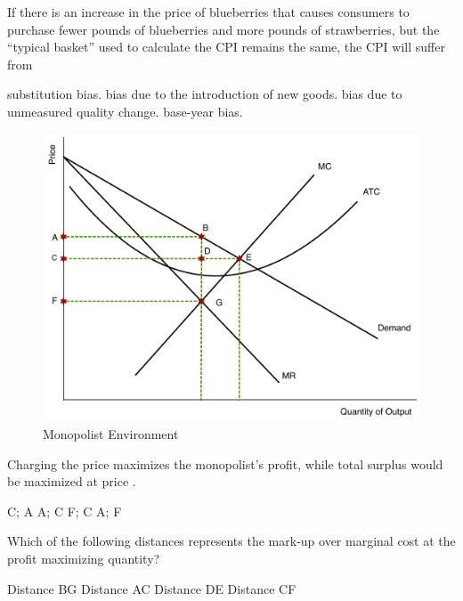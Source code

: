 \documentclass[addpoints,11pt]{exam}
\theoremstyle{definition}
\newcommand{\blank}[0]{\underline{\hspace{3cm}}}
\begin{document}
\begin{questions}
\newpage

	\question If there is an increase in the price of blueberries that causes consumers to purchase fewer pounds of blueberries and more pounds of strawberries, but the ``typical basket'' used to calculate the CPI remains the same, the CPI will suffer from

\begin{choices}
	\CorrectChoice substitution bias.
	\choice bias due to the introduction of new goods.
	\choice bias due to unmeasured quality change.
	\choice base-year bias. 
\end{choices}


\begin{figure}[H]
	\centering
	\includegraphics[scale=.4]{Exam2_MC10.pdf}
	\caption{Monopolist Environment}
	\label{MC10}
\end{figure}

\question \label{q9} Charging the price \blank maximizes the monopolist's profit, while total surplus would be maximized at price \blank.

\begin{choices}
	\choice C; A
	\CorrectChoice  A; C
	\choice F; C
	\choice A; F
\end{choices}


	\question \label{q10} Which of the following distances represents the mark-up over marginal cost at the profit maximizing quantity?

\begin{choices}
	\CorrectChoice Distance BG
	\choice Distance AC
	\choice Distance DE
	\choice Distance CF
\end{choices}


\end{questions}
\end{document}
